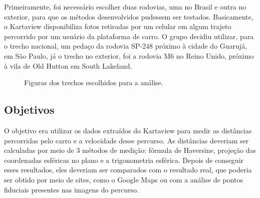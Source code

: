 \documentclass{article}
\begin{document}
\qquad Primeiramente, foi necessário escolher duas rodovias, uma no Brasil e outra no exterior, para que os métodos desenvolvidos pudessem ser testados. Basicamente, o Kartaview disponibiliza fotos retiradas por um celular em algum trajeto percorrido por um usuário da plataforma de carro. O grupo decidiu utilizar, para o trecho nacional, um pedaço da rodovia SP-248 próximo à cidade do Guarujá, em São Paulo, já o trecho no exterior, foi a rodovia M6 no Reino Unido, próximo à vila de Old Hutton em South Lakeland.

\begin{figure}[!h]
    \centering
    \qquad
    \qquad
    \caption{Figuras dos trechos escolhidos para a análise.}
\end{figure}

\subsection{Objetivos}

\qquad O objetivo era utilizar os dados extraídos do Kartaview para medir as distâncias percorridas pelo carro e a velocidade desse percurso. As distâncias deveriam ser calculadas por meio de 3 métodos de medição: fórmula de Haversine, projeção das coordenadas esféricas no plano e a trigonometria esférica. Depois de conseguir esses resultados, eles deveriam ser comparados com o resultado real, que poderia ser obtido por meio de sites, como o Google Maps ou com a análise de pontos fiduciais presentes nas imagens do percurso.
\end{document}
